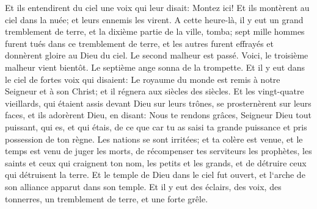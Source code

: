 \verse Et ils entendirent du ciel une voix qui leur disait: Montez ici! Et ils montèrent au ciel dans la nuée; et leurs ennemis les virent. 
\verse A cette heure-là, il y eut un grand tremblement de terre, et la dixième partie de la ville, tomba; sept mille hommes furent tués dans ce tremblement de terre, et les autres furent effrayés et donnèrent gloire au Dieu du ciel. 
\verse Le second malheur est passé. Voici, le troisième malheur vient bientôt. 
\verse Le septième ange sonna de la trompette. Et il y eut dans le ciel de fortes voix qui disaient: Le royaume du monde est remis à notre Seigneur et à son Christ; et il régnera aux siècles des siècles. 
\verse Et les vingt-quatre vieillards, qui étaient assis devant Dieu sur leurs trônes, se prosternèrent sur leurs faces, et ils adorèrent Dieu, 
\verse en disant: Nous te rendons grâces, Seigneur Dieu tout puissant, qui es, et qui étais, de ce que car tu as saisi ta grande puissance et pris possession de ton règne. 
\verse Les nations se sont irritées; et ta colère est venue, et le temps est venu de juger les morts, de récompenser tes serviteurs les prophètes, les saints et ceux qui craignent ton nom, les petits et les grands, et de détruire ceux qui détruisent la terre. 
\verse Et le temple de Dieu dans le ciel fut ouvert, et l`arche de son alliance apparut dans son temple. Et il y eut des éclairs, des voix, des tonnerres, un tremblement de terre, et une forte grêle. 

